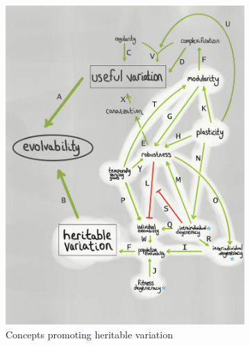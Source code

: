 \begin{figure}
 \centering
    \begin{subfigure}[b]{0.45\textwidth}
        \centering
    	\includegraphics[width=\textwidth]{img/mindmap_heritable_variation}
        \caption{Concepts promoting heritable variation}
        \label{subfig:heritable_variation}
    \end{subfigure}%
    \hfill
    \begin{subfigure}[b]{0.45\textwidth}
        \centering

\end{subfigure}
\end{figure}
